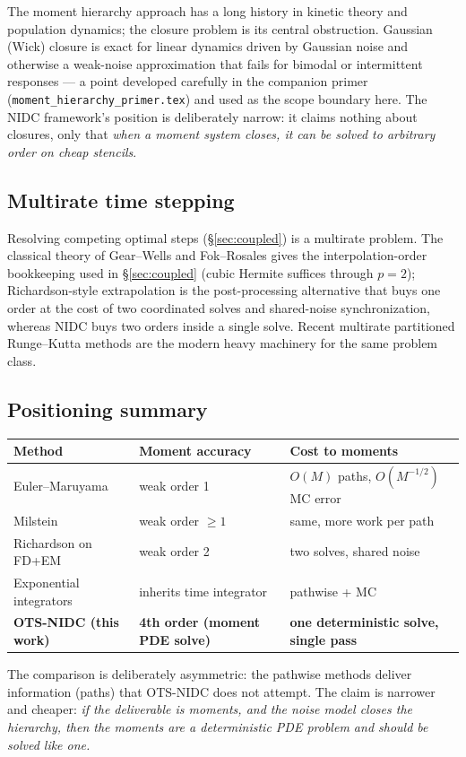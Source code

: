 The moment hierarchy approach has a long history in kinetic theory and
population dynamics; the closure problem is its central obstruction. Gaussian
(Wick) closure is exact for linear dynamics driven by Gaussian noise and
otherwise a weak-noise approximation that fails for bimodal or intermittent
responses --- a point developed carefully in the companion primer
(\texttt{moment\_hierarchy\_primer.tex}) and used as the scope boundary here.
The NIDC framework's position is deliberately narrow: it claims nothing about
closures, only that \emph{when a moment system closes, it can be solved to
arbitrary order on cheap stencils}.

\subsection{Multirate time stepping}

Resolving competing optimal steps (\S\ref{sec:coupled}) is a multirate problem.
The classical theory of Gear--Wells \citep{gear1984} and Fok--Rosales
\citep{fok2010} gives the interpolation-order bookkeeping used in
\S\ref{sec:coupled} (cubic Hermite suffices through $p=2$); Richardson-style
extrapolation \citep{oates2024,
debrabant2011} is the post-processing alternative that buys one order at the
cost of two coordinated solves and shared-noise synchronization, whereas NIDC
buys two orders inside a single solve. Recent multirate partitioned Runge--Kutta
methods \citep{roberts2018} are the modern heavy machinery for the same problem
class.

\subsection{Positioning summary}

\begin{center}
\begin{tabular}{@{}lll@{}}
\toprule
Method & Moment accuracy & Cost to moments \\
\midrule
Euler--Maruyama \citep{lord2014} & weak order 1 & $O(M)$ paths, $O(M^{-1/2})$ MC error \\
Milstein \citep{leonhard2014} & weak order $\ge 1$ & same, more work per path \\
Richardson on FD+EM \citep{oates2024} & weak order 2 & two solves, shared noise \\
Exponential integrators \citep{lord2010} & inherits time integrator & pathwise + MC \\
\textbf{OTS-NIDC (this work)} & \textbf{4th order (moment PDE solve)} & \textbf{one deterministic solve, single pass} \\
\bottomrule
\end{tabular}
\end{center}

The comparison is deliberately asymmetric: the pathwise methods deliver
information (paths) that OTS-NIDC does not attempt. The claim is narrower and
cheaper: \emph{if the deliverable is moments, and the noise model closes the
hierarchy, then the moments are a deterministic PDE problem and should be solved
like one.}
